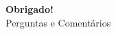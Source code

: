 \documentclass[aspectratio=169]{beamer}
\begin{document}
\begin{frame}
\begin{center}
\Huge \textbf{Obrigado!} \\
\vspace{1cm}
\Large Perguntas e Comentários
\end{center}
\end{frame}
\end{document}
